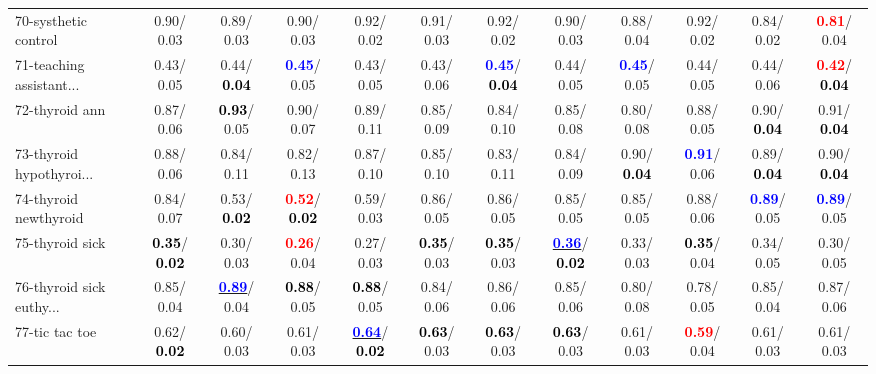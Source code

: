 \begin{table}[h]
\begin{center}
{\begin{tabular}{lc|c|c|c|c|c|c|c|c|c|c}
70-systhetic control &   0.90/  0.03 &   0.89/  0.03 &   0.90/  0.03 &   0.92/  0.02 &   0.91/  0.03 &   0.92/  0.02 &   0.90/  0.03 &   0.88/  0.04 &   0.92/  0.02 &   0.84/  0.02 & \textcolor{red}{\textbf{  0.81}}/  0.04 \\
71-teaching assistant... &   0.43/  0.05 &   0.44/\textcolor{black}{\textbf{  0.04}} & \textcolor{blue}{\textbf{  0.45}}/  0.05 &   0.43/  0.05 &   0.43/  0.06 & \textcolor{blue}{\textbf{  0.45}}/\textcolor{black}{\textbf{  0.04}} &   0.44/  0.05 & \textcolor{blue}{\textbf{  0.45}}/  0.05 &   0.44/  0.05 &   0.44/  0.06 & \textcolor{red}{\textbf{  0.42}}/\textcolor{black}{\textbf{  0.04}} \\ \hline
72-thyroid ann &   0.87/  0.06 & \textcolor{black}{\textbf{  0.93}}/  0.05 &   0.90/  0.07 &   0.89/  0.11 &   0.85/  0.09 &   0.84/  0.10 &   0.85/  0.08 &   0.80/  0.08 &   0.88/  0.05 &   0.90/\textcolor{black}{\textbf{  0.04}} &   0.91/\textcolor{black}{\textbf{  0.04}} \\
73-thyroid hypothyroi... &   0.88/  0.06 &   0.84/  0.11 &   0.82/  0.13 &   0.87/  0.10 &   0.85/  0.10 &   0.83/  0.11 &   0.84/  0.09 &   0.90/\textcolor{black}{\textbf{  0.04}} & \textcolor{blue}{\textbf{  0.91}}/  0.06 &   0.89/\textcolor{black}{\textbf{  0.04}} &   0.90/\textcolor{black}{\textbf{  0.04}} \\
74-thyroid newthyroid &   0.84/  0.07 &   0.53/\textcolor{black}{\textbf{  0.02}} & \textcolor{red}{\textbf{  0.52}}/\textcolor{black}{\textbf{  0.02}} &   0.59/  0.03 &   0.86/  0.05 &   0.86/  0.05 &   0.85/  0.05 &   0.85/  0.05 &   0.88/  0.06 & \textcolor{blue}{\textbf{  0.89}}/  0.05 & \textcolor{blue}{\textbf{  0.89}}/  0.05 \\
75-thyroid sick & \textcolor{black}{\textbf{  0.35}}/\textcolor{black}{\textbf{  0.02}} &   0.30/  0.03 & \textcolor{red}{\textbf{  0.26}}/  0.04 &   0.27/  0.03 & \textcolor{black}{\textbf{  0.35}}/  0.03 & \textcolor{black}{\textbf{  0.35}}/  0.03 & \underline{\textcolor{blue}{\textbf{  0.36}}}/\textcolor{black}{\textbf{  0.02}} &   0.33/  0.03 & \textcolor{black}{\textbf{  0.35}}/  0.04 &   0.34/  0.05 &   0.30/  0.05 \\
76-thyroid sick euthy... &   0.85/  0.04 & \underline{\textcolor{blue}{\textbf{  0.89}}}/  0.04 & \textcolor{black}{\textbf{  0.88}}/  0.05 & \textcolor{black}{\textbf{  0.88}}/  0.05 &   0.84/  0.06 &   0.86/  0.06 &   0.85/  0.06 &   0.80/  0.08 &   0.78/  0.05 &   0.85/  0.04 &   0.87/  0.06 \\
77-tic tac toe &   0.62/\textcolor{black}{\textbf{  0.02}} &   0.60/  0.03 &   0.61/  0.03 & \underline{\textcolor{blue}{\textbf{  0.64}}}/\textcolor{black}{\textbf{  0.02}} & \textcolor{black}{\textbf{  0.63}}/  0.03 & \textcolor{black}{\textbf{  0.63}}/  0.03 & \textcolor{black}{\textbf{  0.63}}/  0.03 &   0.61/  0.03 & \textcolor{red}{\textbf{  0.59}}/  0.04 &   0.61/  0.03 &   0.61/  0.03 \\

\end{tabular}}
\end{center}
\end{table}
